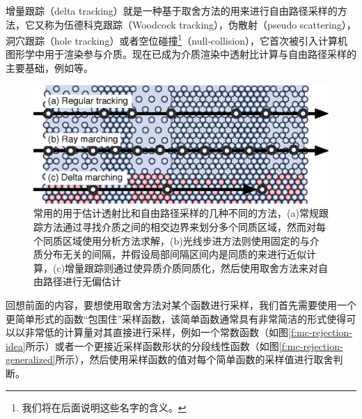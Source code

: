 增量跟踪（delta tracking）就是一种基于取舍方法的用来进行自由路径采样的方法，它又称为伍德科克跟踪（Woodcock tracking）\cite{a:TechniquesusedintheGEMcodeforMonteCarloneu-tronicscalculationsinreactorsandothersystemsofcomplexgeometry}，伪散射（pseudo scattering），洞穴跟踪（hole tracking）或者空位碰撞\footnote{我们将在后面说明这些名字的含义。}（null-collision），它首次被\cite{a:UnbiasedGlobalIlluminationwithParticipatingMedia}引入计算机图形学中用于渲染参与介质。现在已成为介质渲染中透射比计算与自由路径采样的主要基础，例如\cite{a:FreePathSamplinginHighResolutionInhomogeneousParticipatingMedia,a:EfficientFreePathSamplinginInhomogeneousMedia,a:ResidualRatioTrackingforEstimatingAttenuationinParticipatingMedia,a:ProgressivePhotonBeams}等。

\begin{figure}
	\includegraphics[width=1.0\textwidth]{figures/pm/tracking}
	\caption{常用的用于估计透射比和自由路径采样的几种不同的方法，(a)常规跟踪方法通过寻找介质之间的相交边界来划分多个同质区域，然而对每个同质区域使用分析方法求解，(b)光线步进方法则使用固定的与介质分布无关的间隔，并假设局部间隔区间内是同质的来进行近似计算，(c)增量跟踪则通过使异质介质同质化，然后使用取舍方法来对自由路径进行无偏估计}
	\label{f:pm-tracking}
\end{figure}

回想前面的内容，要想使用取舍方法对某个函数进行采样，我们首先需要使用一个更简单形式的函数“包围住”采样函数，该简单函数通常具有非常简洁的形式使得可以以非常低的计算量对其直接进行采样，例如一个常数函数（如图\ref{f:mc-rejection-idea}所示）或者一个更接近采样函数形状的分段线性函数（如图\ref{f:mc-rejection-generalized}所示），然后使用采样函数的值对每个简单函数的采样值进行取舍判断。

